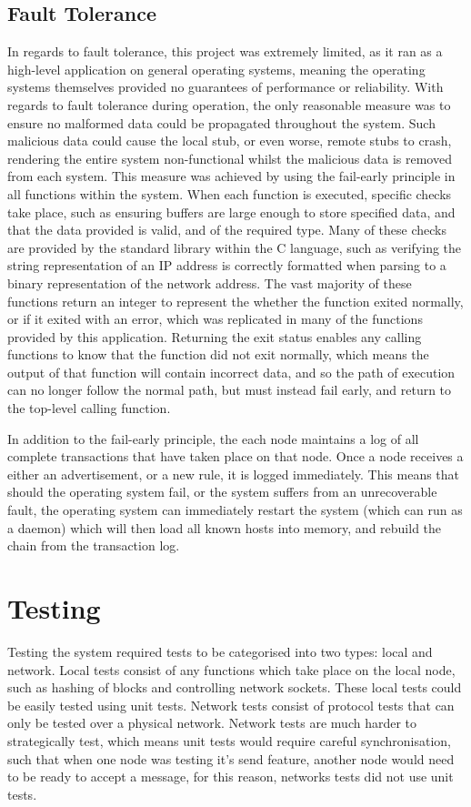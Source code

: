 \documentclass[a4paper, 11pt]{report}
\begin{document}
\section{Fault Tolerance}
In regards to fault tolerance, this project was extremely limited, as it ran as a high-level application on general operating systems, meaning the operating systems themselves provided no guarantees of  performance or reliability. With regards to fault tolerance during operation, the only reasonable measure was to ensure no malformed data could be propagated throughout the system. Such malicious data could cause the local \gls{stub}, or even worse, remote \gls{stub}s to crash, rendering the entire system non-functional whilst the malicious data is removed from each system. This measure was achieved by using the fail-early principle in all functions within the system. When each function is executed, specific checks take place, such as ensuring buffers are large enough to store specified data, and that the data provided is valid, and of the required type. Many of these checks are provided by the standard library within the C language, such as verifying the string representation of an \acrshort{IP} address is  correctly formatted when parsing to a binary representation of the network address. The vast majority of these functions return an integer to represent the whether the function exited normally, or if it exited with an error, which was replicated in many of the functions provided by this application. Returning the exit status enables any calling functions to know that the function did not exit normally, which means the output of that function will contain incorrect data, and so the path of execution can no longer follow the normal path, but must instead fail early, and return to the top-level calling function.

In addition to the fail-early principle, the each node maintains a log of all complete transactions that have taken place on that node. Once a node receives a either an advertisement, or a new rule, it is logged immediately. This means that should the operating system fail, or the system suffers from an unrecoverable fault, the operating system can immediately restart the system (which can run as a daemon) which will then load all known hosts into memory, and rebuild the chain from the transaction log.

\chapter{Testing} \label{test}
Testing the system required tests to be categorised into two types: local and network. Local tests consist of any functions which take place on the local node, such as hashing of blocks and controlling network sockets. These local tests could be easily tested using unit tests. Network tests consist of protocol tests that can only be tested over a physical network. Network tests are much harder to strategically test, which means unit tests would require careful synchronisation, such that when one node was testing it's send feature, another node would need to be ready to accept a message, for this reason, networks tests did not use unit tests.
\end{document}
